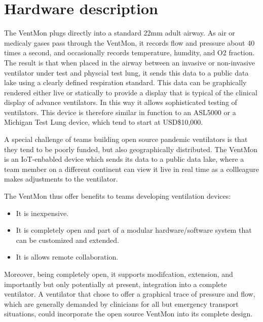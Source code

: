\documentclass[11pt, letterpaper]{article}
\begin{document}
\section{Hardware description}


The VentMon plugs directly into a standard 22mm adult airway. As air or medicaly gases pass through the VentMon, it records flow and pressure about 40 times a second, and occasionally records temperature, humdity, and O2 fraction. The result is that when placed in the airway between an invasive or non-invasive ventilator under test and physcial test lung, it sends this data to a public data lake using a clearly defined respiration standard. This data can be graphically rendered either live or statically to provide a display that is typical of the clinical display of advance ventilators. In this way it allows sophisticated testing of ventilators. This device is therefore similar in function to an ASL5000 or a Michigan Test Lung device, which tend to start at USD\$10,000.

A special challenge of teams building open source pandemic ventilators is that they tend to be poorly funded,
but also geographically distributed. The VentMon is an IoT-enbabled device which sends its data to a public data lake,
where a team member on a different continent can view it live in real time as a collleagure makes adjustments
to the ventilator.

The VentMon thus offer benefits to teams developing ventilation devices:
\begin{itemize}
\item It is inexpensive.
\item It is completely open and part of a modular hardware/software system that can be customized and extended.
\item It is allows remote collaboration.
\end{itemize}

Moreover, being completely open, it supports modifcation, extension, and importantly but only potentially at present, integration into a complete ventilator. A ventilator that chose to offer a graphical trace of pressure and flow, which are generally demanded by clinicians for all but emergency transport situations, could incorporate the open source VentMon into its complete design.
\end{document}
